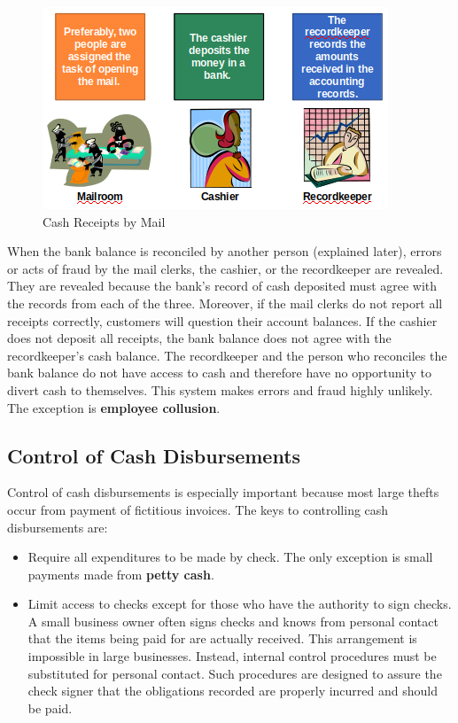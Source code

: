 \documentclass[../main.tex]{subfiles}
\begin{document}
	\begin{figure}[ht]
		\centering
		\includegraphics[width=0.8\columnwidth]{images/c5/mail_cash_receipts.png}
		\caption{Cash Receipts by Mail}
	\end{figure}
	
	When the bank balance is reconciled by another person (explained later), 
	errors or acts of fraud by the mail clerks, the cashier, or the 
	recordkeeper are revealed. They are revealed because the bank’s record of 
	cash deposited must agree with the records from each of the three. 
	Moreover, if the mail clerks do not report all receipts correctly, 
	customers will question their account balances. If the cashier does not 
	deposit all receipts, the bank balance does not agree with the 
	recordkeeper’s cash balance. The recordkeeper and the person who reconciles 
	the bank balance do not have access to cash and therefore have no 
	opportunity to divert cash to themselves. This system makes errors and 
	fraud highly unlikely. The exception is \textbf{employee collusion}.
	
	\subsection{Control of Cash Disbursements}
	
	Control of cash disbursements is especially important because most large 
	thefts occur from payment of fictitious invoices. The keys to controlling 
	cash disbursements are:
	\begin{itemize}[noitemsep]
		\item Require all expenditures to be made by check. The only exception 
		is small payments made from \textbf{petty cash}.
		\item Limit access to checks except for those who have the authority to 
		sign checks. A small business owner often signs checks and knows from 
		personal contact that the items being paid for are actually received. 
		This arrangement is impossible in large businesses. Instead, internal 
		control procedures must be substituted for personal contact. Such 
		procedures are designed to assure the check signer that the obligations 
		recorded are properly incurred and should be paid.
	\end{itemize}
	
\end{document}
